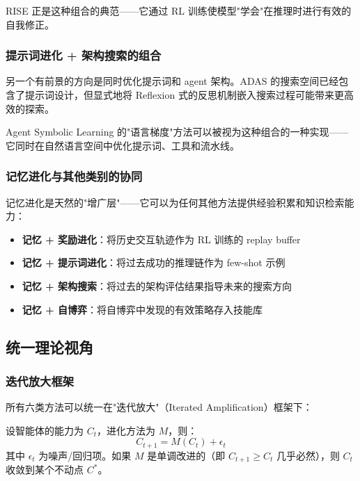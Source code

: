 RISE 正是这种组合的典范——它通过 RL 训练使模型"学会"在推理时进行有效的自我修正。

\subsubsection{提示词进化 + 架构搜索的组合}

另一个有前景的方向是同时优化提示词和 agent 架构。ADAS 的搜索空间已经包含了提示词设计，但显式地将 Reflexion 式的反思机制嵌入搜索过程可能带来更高效的探索。

Agent Symbolic Learning 的"语言梯度"方法可以被视为这种组合的一种实现——它同时在自然语言空间中优化提示词、工具和流水线。

\subsubsection{记忆进化与其他类别的协同}

记忆进化是天然的"增广层"——它可以为任何其他方法提供经验积累和知识检索能力：
\begin{itemize}
\item \textbf{记忆 + 奖励进化}：将历史交互轨迹作为 RL 训练的 replay buffer
\item \textbf{记忆 + 提示词进化}：将过去成功的推理链作为 few-shot 示例
\item \textbf{记忆 + 架构搜索}：将过去的架构评估结果指导未来的搜索方向
\item \textbf{记忆 + 自博弈}：将自博弈中发现的有效策略存入技能库
\end{itemize}

\subsection{统一理论视角}\label{sec:ch3-unified}

\subsubsection{迭代放大框架}

所有六类方法可以统一在"迭代放大"（Iterated Amplification）框架下：

\begin{definition}[迭代放大]
设智能体的能力为 $C_t$，进化方法为 $M$，则：
\begin{equation}
C_{t+1} = M(C_t) + \epsilon_t
\label{eq:iterated-amplification}
\end{equation}
其中 $\epsilon_t$ 为噪声/回归项。如果 $M$ 是单调改进的（即 $C_{t+1} \geq C_t$ 几乎必然），则 $C_t$ 收敛到某个不动点 $C^*$。
\end{definition}

